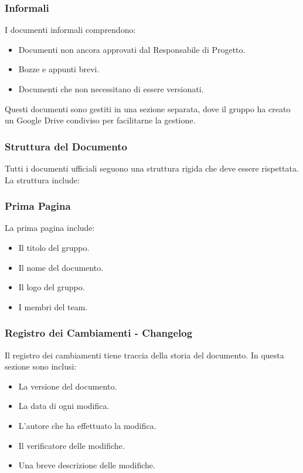 \subsubsection*{Informali}
I documenti informali comprendono:
\begin{itemize}
    \item Documenti non ancora approvati dal Responsabile di Progetto.
    \item Bozze e appunti brevi.
    \item Documenti che non necessitano di essere versionati.
\end{itemize}
Questi documenti sono gestiti in una sezione separata, dove il gruppo ha creato un Google Drive condiviso per 
facilitarne la gestione.

\subsubsection{Struttura del Documento}

Tutti i documenti ufficiali seguono una struttura rigida che deve essere rispettata. La struttura include:

\subsubsection*{Prima Pagina}
La prima pagina include:
\begin{itemize}
    \item Il titolo del gruppo.
    \item Il nome del documento.
    \item Il logo del gruppo.
    \item I membri del team.
\end{itemize}

\subsubsection*{Registro dei Cambiamenti - Changelog}
Il registro dei cambiamenti tiene traccia della storia del documento. In questa sezione sono inclusi:
\begin{itemize}
    \item La versione del documento.
    \item La data di ogni modifica.
    \item L'autore che ha effettuato la modifica.
    \item Il verificatore delle modifiche.
    \item Una breve descrizione delle modifiche.
\end{itemize}

